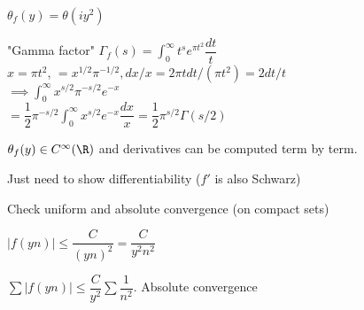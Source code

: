 \documentclass[twoside, 10pt]{article}
\begin{document}
$\theta_f(y) = \theta(iy^2)$

"Gamma factor" $\Gamma_f(s) = \int_0^\infty t^se^{\pi t^2} \dfrac{dt}{t}$\\
$x = \pi t^2$, $ = x^{1/2}\pi^{-1/2}, dx/x = 2\pi t dt/(\pi t^2) = 2dt/t$\\
$\implies \int_0^\infty x^{s/2}\pi^{-s/2}e^{-x}$\\
$ = \dfrac{1}{2}\pi^{-s/2}\int_0^\infty x^{s/2}e^{-x} \dfrac{dx}{x} = \dfrac{1}{2}\pi^{s/2} \Gamma(s/2)$

\begin{lem}
   $\theta_f(y) \in C^\infty(\R)$ and derivatives can be computed term by term. 
\end{lem}
Just need to show differentiability ($f'$ is also Schwarz)

Check uniform and absolute convergence (on compact sets)

$|f(yn)| \leq \dfrac{C}{(yn)^2} = \dfrac{C}{y^2n^2}$

$\sum |f(yn)| \leq \dfrac{C}{y^2}\sum\dfrac{1}{n^2}$. Absolute convergence
\end{document}

